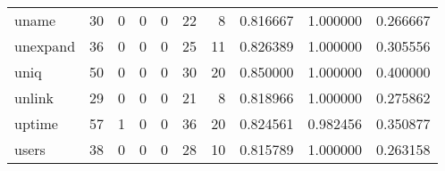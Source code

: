 \begin{tabular}{lrrrrrrrrr}
uname     &                                        30 &                                                  0 &                                                  0 &                                                  0 &                                                 22 &                                                  8 &                                           0.816667 &                               1.000000 &                             0.266667 \\
unexpand  &                                        36 &                                                  0 &                                                  0 &                                                  0 &                                                 25 &                                                 11 &                                           0.826389 &                               1.000000 &                             0.305556 \\
uniq      &                                        50 &                                                  0 &                                                  0 &                                                  0 &                                                 30 &                                                 20 &                                           0.850000 &                               1.000000 &                             0.400000 \\
unlink    &                                        29 &                                                  0 &                                                  0 &                                                  0 &                                                 21 &                                                  8 &                                           0.818966 &                               1.000000 &                             0.275862 \\
uptime    &                                        57 &                                                  1 &                                                  0 &                                                  0 &                                                 36 &                                                 20 &                                           0.824561 &                               0.982456 &                             0.350877 \\
users     &                                        38 &                                                  0 &                                                  0 &                                                  0 &                                                 28 &                                                 10 &                                           0.815789 &                               1.000000 &                             0.263158 \\

\end{tabular}
